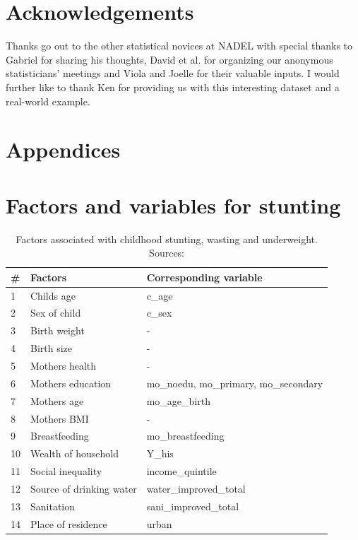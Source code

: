 \documentclass[a4paper, 11pt]{article} %
\begin{document}
\section{Acknowledgements}
Thanks go out to the other statistical novices at NADEL with special thanks to Gabriel for sharing his thoughts, David et al. for organizing our anonymous statisticians' meetings and Viola and Joelle for their valuable inputs. I would further like to thank Ken for providing us with this interesting dataset and a real-world example.


\newpage




\newpage
\section*{Appendices}
\appendix
\section{Factors and variables for stunting} \label{sec:appendix_tab_stunting}
\begin{table}[h!]
\begin{tabular}{@{}lll@{}}
\toprule
\# & \textbf{Factors} & \textbf{Corresponding variable} \\ \midrule
1 & Childs age & c\_age \\
2 & Sex of child & c\_sex  \\
3 & Birth weight & -  \\
4 & Birth size & - \\ \midrule

5 & Mothers health & - \\
6 & Mothers education & mo\_noedu, mo\_primary, mo\_secondary \\
7 & Mothers age  & mo\_age\_birth \\
8 & Mothers BMI & - \\
9 & Breastfeeding & mo\_breastfeeding \\ \midrule

10 & Wealth of household & Y\_his  \\
11 & Social inequality & income\_quintile \\
12 & Source of drinking water & water\_improved\_total  \\
13 & Sanitation &  sani\_improved\_total  \\
14 & Place of residence & urban  \\ \bottomrule
\end{tabular}
    \caption{Factors associated with childhood stunting, wasting and underweight. Sources: \cite{Akombi2017Aug} \cite{UNI18}}
    \label{table:stunting}
\end{table}
\end{document}
